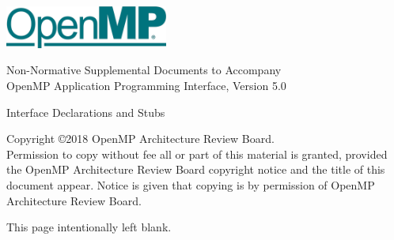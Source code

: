 
  \begin{titlepage}
    \begin{flushleft}
     \hspace{-6em} \includegraphics[width=0.4\textwidth]{../openmp-logo.png}
    \end{flushleft}

    \begin{adjustwidth}{-0.75in}{0in}
    \begin{center}
      \Huge
      \textsf{Non-Normative Supplemental Documents to Accompany \\}
      \huge
      \textsf{OpenMP Application Programming Interface, Version 5.0}

      \vspace{0.5in}\textsf{ Interface Declarations and Stubs }\vspace{-0.7in}
      \normalsize

      \vspace{1.0in}

    \end{center}
    \end{adjustwidth}

    \vspace{3.0in}

\begin{adjustwidth}{0pt}{1em}\setlength{\parskip}{0.25\baselineskip}%
Copyright \copyright 2018 OpenMP Architecture Review Board.\\
Permission to copy without fee all or part of this material is granted,
provided the OpenMP Architecture Review Board copyright notice and
the title of this document appear. Notice is given that copying is by
permission of OpenMP Architecture Review Board.\end{adjustwidth}

  \end{titlepage}


\clearpage
\thispagestyle{empty}
\phantom{a}
This page intentionally left blank.

\vfill

